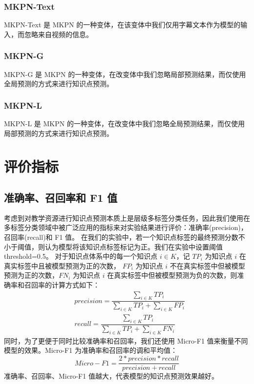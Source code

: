     \subsubsection{MKPN-Text}
    MKPN-Text 是 MKPN 的一种变体，在该变体中我们仅用字幕文本作为模型的输入，而忽略来自视频的信息。

    \subsubsection{MKPN-G}
    MKPN-G 是 MKPN 的一种变体，在改变体中我们忽略局部预测结果，而仅使用全局预测的方式来进行知识点预测。

    \subsubsection{MKPN-L}
    MKPN-L 是 MKPN 的一种变体，在改变体中我们忽略全局预测结果，而仅使用局部预测的方式来进行知识点预测。


\section{评价指标}
    \subsection{准确率、召回率和 F1 值}
    考虑到对教学资源进行知识点预测本质上是层级多标签分类任务，因此我们使用在多标签分类领域中被广泛应用的指标来对实验结果进行评价：准确率(precision)，召回率(recall)和 F1 值。
    在我们的实验中，若一个知识点标签的最终预测分数不小于阈值，则认为模型将该知识点标签标记为正。我们在实验中设置阈值 threshold=0.5。
    对于知识点体系中的每一个知识点 $i \in K$，记 $TP_i$ 为知识点 $i$ 在真实标签中且被模型预测为正的次数，
    $FP_i$ 为知识点 $i$ 不在真实标签中但被模型预测为正的次数，$FN_i$ 为知识点 $i$ 在真实标签中但被模型预测为负的次数，则准确率和召回率的计算方式如下：
    \begin{equation}
        \begin{aligned}
            &precision = \dfrac{\sum_{i \in K}TP_i}{\sum_{i \in K}TP_i + \sum_{i \in K}FP_i} \\
            &recall = \dfrac{\sum_{i \in K}TP_i}{\sum_{i \in K}TP_i + \sum_{i \in K}FN_i}
        \end{aligned}
    \end{equation}
    同时，为了更便于同时比较准确率和召回率，我们还使用 Micro-F1 值来衡量不同模型的效果。Micro-F1 为准确率和召回率的调和平均值：
    \begin{equation}
        Micro-F1 = \dfrac{2 * precision * recall}{precision + recall}
    \end{equation}
    准确率、召回率、Micro-F1 值越大，代表模型的知识点预测效果越好。

